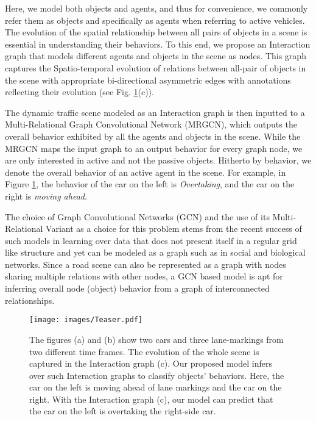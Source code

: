\documentclass[letterpaper, 10 pt, conference]{ieeeconf}
\begin{document}
Here, we model both objects and agents, and thus for convenience, we commonly refer them as objects and specifically as agents when referring to active vehicles. The evolution of the spatial relationship between all pairs of objects in a scene is essential in understanding their behaviors. To this end, we propose an Interaction graph that models different agents and objects in the scene as nodes. This graph captures the Spatio-temporal evolution of relations between all-pair of objects in the scene with appropriate bi-directional asymmetric edges with annotations reflecting their evolution (see Fig. \ref{fig:teaser}(c)). 

The dynamic traffic scene modeled as an Interaction graph is then inputted to a Multi-Relational Graph Convolutional Network (MRGCN), which outputs the overall behavior exhibited by all the agents and objects in the scene. While the MRGCN maps the input graph to an output behavior for every graph node, we are only interested in active and not the passive objects. Hitherto by behavior, we denote the overall behavior of an active agent in the scene.  For example, in Figure \ref{fig:teaser}, the behavior of the car on the left is \textit{Overtaking}, and the car on the right is \textit{moving ahead}.

The choice of Graph Convolutional Networks (GCN) \cite{kipf2016semi} and the use of its Multi-Relational Variant as a choice for this problem stems from the recent success of such models in learning over data that does not present itself in a regular grid like structure and yet can be modeled as a graph such as in social and biological networks.  Since a road scene can also be represented as a graph with nodes sharing multiple relations with other nodes, a GCN based model is apt for inferring overall node (object) behavior from a graph of interconnected relationships.

\begin{figure}[!t]
    \centering
\texttt{[image: images/Teaser.pdf]}
    \caption{\scriptsize 
    The figures (a) and (b)  show two cars and three lane-markings from two different time frames.  The evolution of the whole scene is captured in the Interaction graph (c). Our proposed model infers over such Interaction graphs to classify objects' behaviors. Here, the car on the left is moving ahead of lane markings and the car on the right. With the Interaction graph (c), our model can predict that the car on the left is overtaking the right-side car.}
    \vspace{-6mm}
    \label{fig:teaser}
\end{figure}
\end{document}
